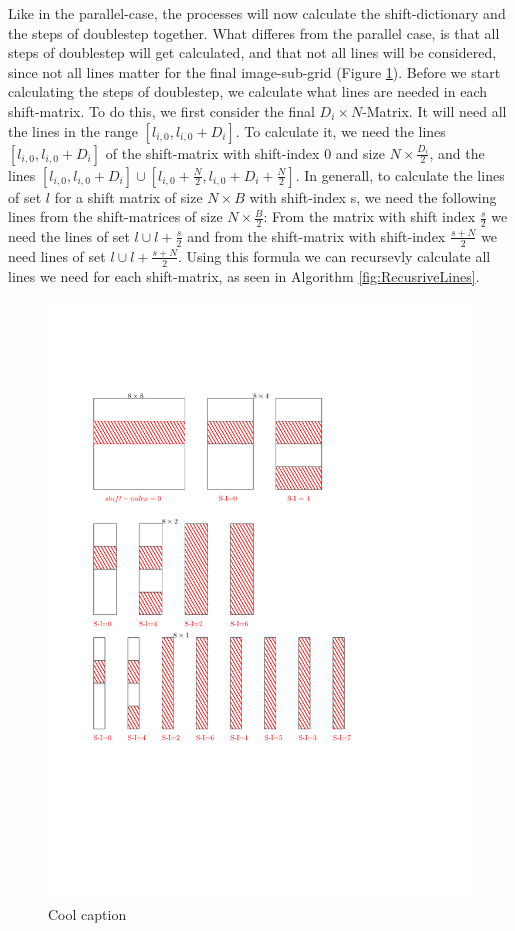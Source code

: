 \documentclass[12pt]{article}
\begin{document}
Like in the parallel-case, the processes will now calculate the shift-dictionary and the steps of doublestep together. What differes from the parallel case, is that all steps of doublestep will get calculated, and that not all lines will be considered, since not all lines matter for the final image-sub-grid (Figure \ref{fig:doubleStep}). Before we start calculating the steps of doublestep, we calculate what lines are needed in each shift-matrix. To do this, we first consider the final $D_i \times N$-Matrix. It will need all the lines in the range $[l_{i,0},l_{i,0}+D_i]$. To calculate it, we need the lines $[l_{i,0},l_{i,0}+D_i]$ of the shift-matrix with shift-index 0 and size $N \times \frac{D_i}{2}$, and the lines $[l_{i,0},l_{i,0}+D_i] \cup [l_{i,0}+\frac{N}{2},l_{i,0}+D_i+\frac{N}{2}]$. In generall, to calculate the lines of set $l$ for a shift matrix of size $N \times B$ with shift-index s, we need the following lines from the shift-matrices of size $N \times \frac{B}{2}$: From the matrix with shift index $\frac{s}{2}$ we need the lines of set $l \cup l+\frac{s}{2}$ and from the shift-matrix with shift-index $\frac{s+N}{2}$ we need lines of set $l \cup l+\frac{s+N}{2}$. Using this formula we can recursevly calculate all lines we need for each shift-matrix, as seen in Algorithm \ref{fig:RecusriveLines}.\\

\begin{figure}[ht]
\includegraphics{doubleStepPerpendicular}
\caption{Cool caption}
\label{fig:doubleStep}
\end{figure}
\end{document}
